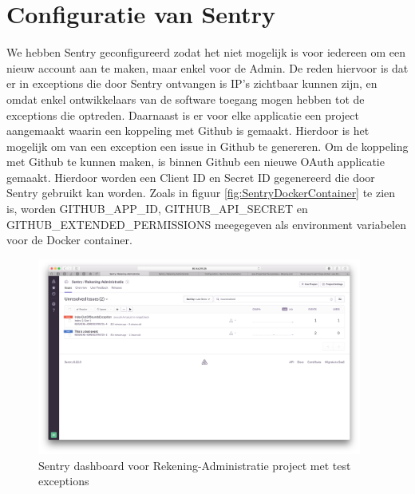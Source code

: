 \section{Configuratie van Sentry}
We hebben Sentry geconfigureerd zodat het niet mogelijk is voor iedereen om een nieuw account aan te maken, maar enkel voor de Admin. De reden hiervoor is dat er in exceptions die door Sentry ontvangen is IP's zichtbaar kunnen zijn, en omdat enkel ontwikkelaars van de software toegang mogen hebben tot de exceptions die optreden.
Daarnaast is er voor elke applicatie een project aangemaakt waarin een koppeling met Github is gemaakt. Hierdoor is het mogelijk om van een exception een issue in Github te genereren.
\newline
Om de koppeling met Github te kunnen maken, is binnen Github een nieuwe OAuth applicatie gemaakt. Hierdoor worden een Client ID en Secret ID gegenereerd die door Sentry gebruikt kan worden. Zoals in figuur \ref{fig:SentryDockerContainer} te zien is, worden GITHUB\_APP\_ID, GITHUB\_API\_SECRET en GITHUB\_EXTENDED\_PERMISSIONS meegegeven als environment variabelen voor de Docker container.

\begin{figure}[H]
	\centering
	\includegraphics[width=0.95\textwidth]{img/SentryDashboard.png}
	\caption{Sentry dashboard voor Rekening-Administratie project met test exceptions}
	\label{fig:SentryDashboard}
\end{figure}
\newpage
